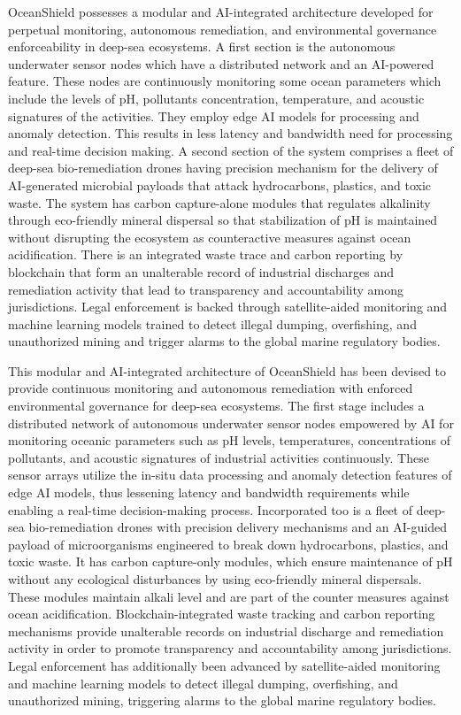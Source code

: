 \documentclass[a4paper]{article}
\begin{document}
OceanShield possesses a modular and AI-integrated architecture developed for perpetual monitoring, autonomous remediation, and environmental governance enforceability in deep-sea ecosystems. A first section is the autonomous underwater sensor nodes which have a distributed network and an AI-powered feature. These nodes are continuously monitoring some ocean parameters which include the levels of pH, pollutants concentration, temperature, and acoustic signatures of the activities. They employ edge AI models for processing and anomaly detection. This results in less latency and bandwidth need for processing and real-time decision making. A second section of the system comprises a fleet of deep-sea bio-remediation drones having precision mechanism for the delivery of AI-generated microbial payloads that attack hydrocarbons, plastics, and toxic waste. The system has carbon capture-alone modules that regulates alkalinity through eco-friendly mineral dispersal so that stabilization of pH is maintained without disrupting the ecosystem as counteractive measures against ocean acidification. There is an integrated waste trace and carbon reporting by blockchain that form an unalterable record of industrial discharges and remediation activity that lead to transparency and accountability among jurisdictions. Legal enforcement is backed through satellite-aided monitoring and machine learning models trained to detect illegal dumping, overfishing, and unauthorized mining and trigger alarms to the global marine regulatory bodies.

This modular and AI-integrated architecture of OceanShield has been devised to provide continuous monitoring and autonomous remediation with enforced environmental governance for deep-sea ecosystems. The first stage includes a distributed network of autonomous underwater sensor nodes empowered by AI for monitoring oceanic parameters such as pH levels, temperatures, concentrations of pollutants, and acoustic signatures of industrial activities continuously. These sensor arrays utilize the in-situ data processing and anomaly detection features of edge AI models, thus lessening latency and bandwidth requirements while enabling a real-time decision-making process. Incorporated too is a fleet of deep-sea bio-remediation drones with precision delivery mechanisms and an AI-guided payload of microorganisms engineered to break down hydrocarbons, plastics, and toxic waste. It has carbon capture-only modules, which ensure maintenance of pH without any ecological disturbances by using eco-friendly mineral dispersals. These modules maintain alkali level and are part of the counter measures against ocean acidification. Blockchain-integrated waste tracking and carbon reporting mechanisms provide unalterable records on industrial discharge and remediation activity in order to promote transparency and accountability among jurisdictions. Legal enforcement has additionally been advanced by satellite-aided monitoring and machine learning models to detect illegal dumping, overfishing, and unauthorized mining, triggering alarms to the global marine regulatory bodies.
\end{document}
